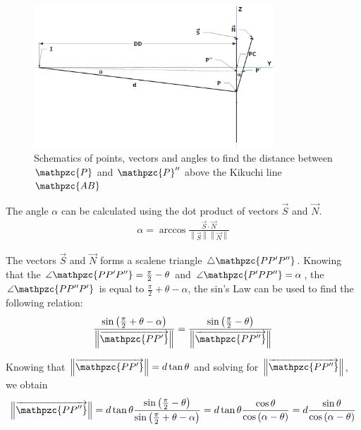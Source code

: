 \documentclass[letterpaper]{article}
\newcommand{\norm}[1]{\left\|#1\right\|}
\newcommand{\var}[1]{\mathpzc{#1}}
\begin{document}
	\begin{figure}
		\centering
		\includegraphics[width=0.8\textwidth]{figures/widthangle2}
		\caption{Schematics of points, vectors and angles to find the distance between $\var{P}$ and $\var{P}^{\prime\prime}$ above the Kikuchi line $\var{AB}$}
		\label{fig:widthangle2}
	\end{figure}
	
	The angle $\alpha$ can be calculated using the dot product of vectors $\vec{S}$ and $\vec{N}$. 
	\begin{eqnarray}
		\alpha = \arccos{\frac{\vec{S}\cdot\vec{N}}{\norm{\vec{S}}\norm{\vec{N}}}}
		\label{eq:alpha}
	\end{eqnarray}
	
	The vectors $\vec{S}$ and $\vec{N}$ forms a scalene triangle $\triangle\var{PP^\prime P^{\prime\prime}}$. 
	Knowing that the $\angle\var{PP^\prime P^{\prime\prime}} = \frac{\pi}{2}-\theta$ and $\angle\var{P^\prime PP^{\prime\prime}} = \alpha$, the $\angle\var{PP^{\prime\prime}P^\prime}$ is equal to $\frac{\pi}{2} + \theta - \alpha$, the sin's Law can be used to find the following relation:
	\begin{eqnarray}
		\frac{\sin{\left(\frac{\pi}{2} + \theta - \alpha\right)}}{\norm{\overrightarrow{\var{PP^\prime}}}} = \frac{\sin{\left(\frac{\pi}{2} - \theta\right)}}{\norm{\overrightarrow{\var{PP^{\prime\prime}}}}}
		\label{eq:sinlaw}
	\end{eqnarray}
	
	Knowing that $\norm{\overrightarrow{\var{PP^\prime}}} = d\tan\theta$ and solving for $\norm{\overrightarrow{\var{PP^{\prime\prime}}}}$, we obtain
	\begin{eqnarray}
		\norm{\overrightarrow{\var{PP^{\prime\prime}}}} = d\tan\theta \frac{\sin{\left(\frac{\pi}{2} - \theta\right)}}{\sin{\left(\frac{\pi}{2} + \theta - \alpha\right)}} = d\tan\theta \frac{\cos{\theta}}{\cos{\left(\alpha - \theta\right)}} = d \frac{\sin{\theta}}{\cos{\left(\alpha - \theta\right)}}
		\label{eq:width1}
	\end{eqnarray}
	
\end{document}
